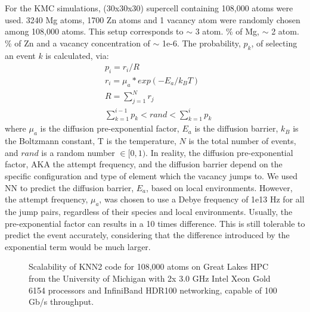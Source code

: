 For the \ac{KMC} simulations, (30x30x30) supercell containing 108,000 atoms were used. 3240 Mg atoms, 1700 Zn atoms and 1 vacancy atom were randomly chosen among 108,000 atoms. This setup corresponds to $\sim$ 3 atom. \% of Mg, $\sim$ 2 atom. \% of Zn and a vacancy concentration of $\sim$ 1e-6. The probability, $p_k$, of selecting an event $k$ is calculated, via:
\begin{subequations}
\begin{align}
& p_i = r_i / R    \label{Chap:Al/Vac:eq:prob} \\
& r_i = \mu_a * exp(- E_a / k_B T)  \label{Chap:Al/Vac:eq:rate} \\
& R = \sum_{j=1}^N r_j \label{Chap:Al/Vac:eq:R} \\
& \sum_{k=1}^{i-1} p_k < rand < \sum_{k=1}^{i} p_k \label{Chap:Al/Vac:eq:choice}
\end{align}
\end{subequations}
where $\mu_a$ is the diffusion pre-exponential factor, $E_a$ is the diffusion barrier, $k_B$ is the Boltzmann constant, T is the temperature, $N$ is the total number of events, and $rand$ is a random number $\in [0, 1)$. In reality, the diffusion pre-exponential factor, AKA the attempt frequency, and the diffusion barrier depend on the specific configuration \cite{osti_323431,van2001first,le2002kinetic} and type of element which the vacancy jumps to\cite{clouet2004nucleation}. We used \ac{NN} to predict the diffusion barrier, $E_a$, based on local environments. However, the attempt frequency, $\mu_a$, was chosen to use a Debye frequency of 1e13 Hz for all the jump pairs, regardless of their species and local environments. Usually, the pre-exponential factor can results in a 10 times difference. This is still tolerable to predict the event accurately, considering that the difference introduced by the exponential term would be much larger.


\newpage
\begingroup
\begin{figure}[!ht]
  \centering
\caption[Scalability of KNN2 code on Great Lakes HPC.]{Scalability of KNN2 code for 108,000 atoms on Great Lakes HPC from the University of Michigan with 2x 3.0 GHz Intel Xeon Gold 6154 processors and InfiniBand HDR100 networking, capable of 100 Gb/s throughput.}
\label{Chap:Al/Vac:fig:scale}
\end{figure}
\endgroup


